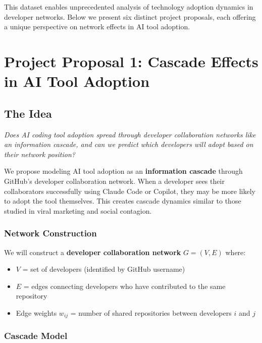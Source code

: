 \documentclass[11pt,letterpaper]{article}
\begin{document}
This dataset enables unprecedented analysis of technology adoption dynamics in developer networks. Below we present six distinct project proposals, each offering a unique perspective on network effects in AI tool adoption.

\section{Project Proposal 1: Cascade Effects in AI Tool Adoption}

\subsection{The Idea}

\begin{tcolorbox}[colback=blue!5,colframe=blue!75!black,title=Core Question]
\textit{Does AI coding tool adoption spread through developer collaboration networks like an information cascade, and can we predict which developers will adopt based on their network position?}
\end{tcolorbox}

We propose modeling AI tool adoption as an \textbf{information cascade} through GitHub's developer collaboration network. When a developer sees their collaborators successfully using Claude Code or Copilot, they may be more likely to adopt the tool themselves. This creates cascade dynamics similar to those studied in viral marketing and social contagion.

\subsubsection{Network Construction}

We will construct a \textbf{developer collaboration network} $G = (V, E)$ where:
\begin{itemize}
    \item $V$ = set of developers (identified by GitHub username)
    \item $E$ = edges connecting developers who have contributed to the same repository
    \item Edge weights $w_{ij}$ = number of shared repositories between developers $i$ and $j$
\end{itemize}

\subsubsection{Cascade Model}
\end{document}
